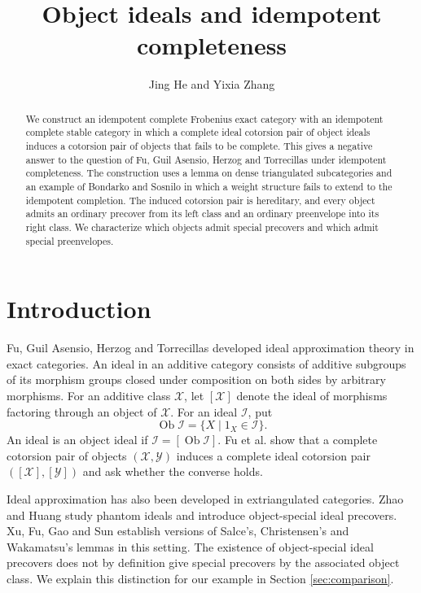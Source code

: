 \documentclass[11pt,a4paper,reqno]{amsart}
\title[Object ideals and idempotent completeness]{Object ideals and idempotent completeness}
\author{Jing He and Yixia Zhang}
\date{}
\newcommand{\Ical}{\mathcal I}
\newcommand{\Xcal}{\mathcal X}
\theoremstyle{plain}
\theoremstyle{definition}
\theoremstyle{remark}
\newcommand{\Ycal}{\mathcal Y}
\newcommand{\Ob}{\operatorname{Ob}}
\begin{document}

\begin{abstract}
We construct an idempotent complete Frobenius exact category with an idempotent complete stable category in which a complete ideal cotorsion pair of object ideals induces a cotorsion pair of objects that fails to be complete. This gives a negative answer to the question of Fu, Guil Asensio, Herzog and Torrecillas under idempotent completeness. The construction uses a lemma on dense triangulated subcategories and an example of Bondarko and Sosnilo in which a weight structure fails to extend to the idempotent completion. The induced cotorsion pair is hereditary, and every object admits an ordinary precover from its left class and an ordinary preenvelope into its right class. We characterize which objects admit special precovers and which admit special preenvelopes.
\end{abstract}



\makeatletter
{}
\makeatother
{}

\maketitle

\section{Introduction}

Fu, Guil Asensio, Herzog and Torrecillas \cite{FGHT13} developed ideal approximation theory in exact categories. An ideal in an additive category consists of additive subgroups of its morphism groups closed under composition on both sides by arbitrary morphisms. For an additive class $\Xcal$, let $[\Xcal]$ denote the ideal of morphisms factoring through an object of $\Xcal$. For an ideal $\Ical$, put
$$
\Ob\Ical=\{X\mid 1_X\in\Ical\}.
$$
An ideal is an object ideal if $\Ical=[\Ob\Ical]$. Fu et al. \cite[Theorem~28 and Question~29]{FGHT13} show that a complete cotorsion pair of objects $(\Xcal,\Ycal)$ induces a complete ideal cotorsion pair $([\Xcal],[\Ycal])$ and ask whether the converse holds.

Ideal approximation has also been developed in extriangulated categories. Zhao and Huang \cite{ZH19} study phantom ideals and introduce object-special ideal precovers. Xu, Fu, Gao and Sun \cite[Theorems~3.5, 4.3 and~5.4]{XFGS26} establish versions of Salce's, Christensen's and Wakamatsu's lemmas in this setting. The existence of object-special ideal precovers does not by definition give special precovers by the associated object class. We explain this distinction for our example in Section \ref{sec:comparison}.
\end{document}
